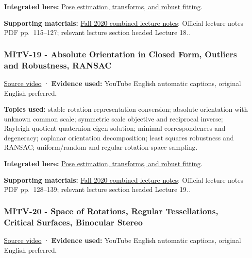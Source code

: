\textbf{Integrated here:} \hyperref[04-visual-computing-ii-ch032-pose-estimation-transforms-and-robust-fitting]{Pose estimation, transforms, and robust fitting}.

\textbf{Supporting materials:} \href{https://ocw.mit.edu/courses/6-801-machine-vision-fall-2020/9ec44f69e72995c370b3797818ba01e6_MIT6_801F20_lectureNotes.pdf}{Fall 2020 combined lecture notes}: Official lecture notes PDF pp.~115--127; relevant lecture section headed Lecture 18..

\subsubsection{MITV-19 - Absolute Orientation in Closed Form, Outliers and Robustness, RANSAC}\label{04-visual-computing-ii-ch036-mitv-19---absolute-orientation-in-closed-form-outliers-and-robustness-ransac}

\href{https://www.youtube.com/watch?v=kigLhcTm_gg}{Source video} · \textbf{Evidence used:} YouTube English automatic captions, original English preferred.

\textbf{Topics used:} stable rotation representation conversion; absolute orientation with unknown common scale; symmetric scale objective and reciprocal inverse; Rayleigh quotient quaternion eigen-solution; minimal correspondences and degeneracy; coplanar orientation decomposition; least squares robustness and RANSAC; uniform/random and regular rotation-space sampling.

\textbf{Integrated here:} \hyperref[04-visual-computing-ii-ch032-pose-estimation-transforms-and-robust-fitting]{Pose estimation, transforms, and robust fitting}.

\textbf{Supporting materials:} \href{https://ocw.mit.edu/courses/6-801-machine-vision-fall-2020/9ec44f69e72995c370b3797818ba01e6_MIT6_801F20_lectureNotes.pdf}{Fall 2020 combined lecture notes}: Official lecture notes PDF pp.~128--139; relevant lecture section headed Lecture 19..

\subsubsection{MITV-20 - Space of Rotations, Regular Tessellations, Critical Surfaces, Binocular Stereo}\label{04-visual-computing-ii-ch036-mitv-20---space-of-rotations-regular-tessellations-critical-surfaces-binocular-stereo}

\href{https://www.youtube.com/watch?v=Mcy-LlcD8jI}{Source video} · \textbf{Evidence used:} YouTube English automatic captions, original English preferred.

